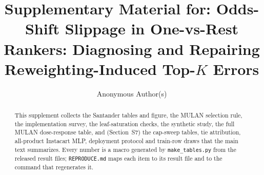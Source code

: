\documentclass[sigconf,nonacm]{acmart}
\begin{document}
\title{Supplementary Material for: Odds-Shift Slippage in One-vs-Rest Rankers: Diagnosing and Repairing Reweighting-Induced Top-$K$ Errors}

\author{Anonymous Author(s)}

\begin{abstract}
This supplement collects the Santander tables and figure, the MULAN selection rule, the implementation survey, the leaf-saturation checks, the synthetic study, the full MULAN dose-response table, and (Section~S7) the cap-sweep tables, tie attribution, all-product Instacart MLP, deployment protocol and train-row draws that the main text summarizes. Every number is a macro generated by \texttt{make\_tables.py} from the released result files; \texttt{REPRODUCE.md} maps each item to its result file and to the command that regenerates it.
\end{abstract}
\maketitle
\end{document}
